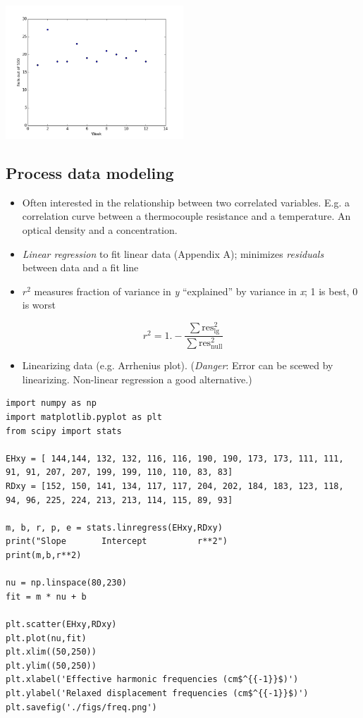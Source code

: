 \documentclass[11pt]{article}
\begin{document}
\includegraphics[width=0.5\textwidth]{./figs/QA.png}

\subsection{Process data modeling}
\label{sec-3-8}
\begin{itemize}
\item Often interested in the relationship between two correlated variables.  E.g. a correlation curve between a thermocouple resistance and a temperature.  An optical density and a concentration.
\item \emph{Linear regression} to fit linear data (Appendix A); minimizes \emph{residuals} between data and a fit line
\item \(r^{2}\) measures fraction of variance in \emph{y} ``explained'' by variance in \emph{x}; 1 is best, 0 is worst
\end{itemize}
\[ r^{2} = 1. - \frac{\sum \text{res}_\text{lg}^{2}}{\sum \text{res}_\text{null}^{2}} \]
\begin{itemize}
\item Linearizing data (e.g. Arrhenius plot).  (\emph{Danger}: Error can be scewed by linearizing.  Non-linear regression a good alternative.)
\end{itemize}

\begin{verbatim}
import numpy as np
import matplotlib.pyplot as plt
from scipy import stats

EHxy = [ 144,144, 132, 132, 116, 116, 190, 190, 173, 173, 111, 111, 91, 91, 207, 207, 199, 199, 110, 110, 83, 83]
RDxy = [152, 150, 141, 134, 117, 117, 204, 202, 184, 183, 123, 118, 94, 96, 225, 224, 213, 213, 114, 115, 89, 93]

m, b, r, p, e = stats.linregress(EHxy,RDxy)
print("Slope       Intercept          r**2")
print(m,b,r**2)

nu = np.linspace(80,230)
fit = m * nu + b

plt.scatter(EHxy,RDxy)
plt.plot(nu,fit)
plt.xlim((50,250))
plt.ylim((50,250))
plt.xlabel('Effective harmonic frequencies (cm$^{{-1}}$)')
plt.ylabel('Relaxed displacement frequencies (cm$^{{-1}}$)')
plt.savefig('./figs/freq.png')
\end{verbatim}
\end{document}
